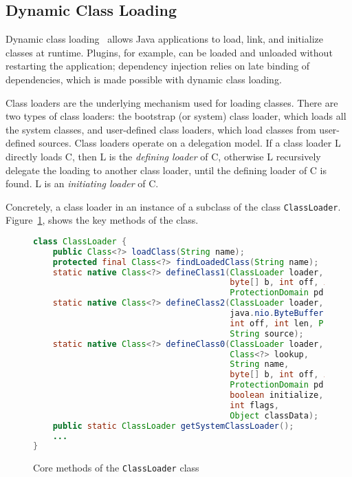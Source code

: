 \subsection{Dynamic Class Loading}
Dynamic class loading~\cite{liang_dynamic_nodate} allows Java applications to load, link, and initialize classes at runtime. Plugins, for example, can be loaded and unloaded without restarting the application; dependency injection relies on late binding of dependencies, which is made possible with dynamic class loading. 

Class loaders are the underlying mechanism used for loading classes. 
There are two types of class loaders: the bootstrap (or system) class loader, which loads all the system classes, and user-defined class loaders, which load classes from user-defined sources.
Class loaders operate on a delegation model. If a class loader L directly loads C, then L is the \emph{defining loader} of C, otherwise L recursively delegate the loading to another class loader, until the defining loader of C is found. L is an \emph{initiating loader} of C. 

Concretely, a class loader in an instance of a subclass of the class \verb|ClassLoader|. 
Figure~\ref{fig:classloader}, shows the key methods of the class.

\begin{figure}[ht]
    \centering
\begin{lstlisting}[language=Java]
class ClassLoader {
    public Class<?> loadClass(String name);
    protected final Class<?> findLoadedClass(String name);
    static native Class<?> defineClass1(ClassLoader loader, String name, 
                                        byte[] b, int off, int len,
                                        ProtectionDomain pd, String source);
    static native Class<?> defineClass2(ClassLoader loader, String name, 
                                        java.nio.ByteBuffer b,
                                        int off, int len, ProtectionDomain pd,
                                        String source);
    static native Class<?> defineClass0(ClassLoader loader,
                                        Class<?> lookup,
                                        String name,
                                        byte[] b, int off, int len,
                                        ProtectionDomain pd,
                                        boolean initialize,
                                        int flags,
                                        Object classData);
    public static ClassLoader getSystemClassLoader();
    ...
}
\end{lstlisting}
    \caption{Core methods of the \texttt{ClassLoader} class}
    \label{fig:classloader}
\end{figure}


